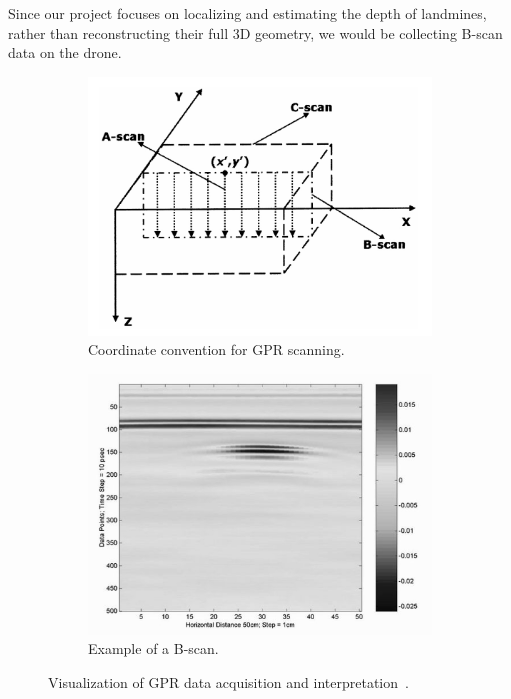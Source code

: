 Since our project focuses on localizing and estimating the depth of landmines, rather than reconstructing their full 3D geometry, we would be collecting B-scan data on the drone.

\begin{figure}[h!]
    \centering
    \begin{subfigure}[b]{0.48\linewidth}
        \centering
        \includegraphics[width=\linewidth]{figs/Huirui/gpr_coords.png}
        \caption{Coordinate convention for GPR scanning.}
        \label{fig:gpr_coords}
    \end{subfigure}
    \hfill
    \begin{subfigure}[b]{0.48\linewidth}
        \centering
        \includegraphics[width=\linewidth]{figs/Huirui/gpr_bscan.png}
        \caption{Example of a B-scan.}
        \label{fig:gpr_bscan}
    \end{subfigure}
    \caption{Visualization of GPR data acquisition and interpretation~\cite{paik2002image}.}
\end{figure}


